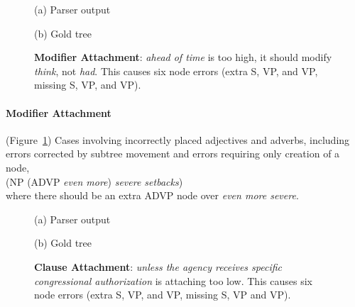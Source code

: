 \begin{figure}
\begin{center}

\vspace{3mm}
(a) Parser output

\vspace{6mm}


\vspace{3mm}
(b) Gold tree
\end{center}
\derivspace
\caption[Error analysis example: modifier attachment.]{ \label{fig:modifier-attachment} 
	\textbf{Modifier Attachment}: \emph{ahead of time} is too high, it should
	modify \emph{think}, not \emph{had}.  This causes six node errors (extra
	S, VP, and VP, missing S, VP, and VP).
}
\derivaftercompress
\end{figure}

\paragraph{Modifier Attachment} (Figure~\ref{fig:modifier-attachment})  Cases involving incorrectly placed adjectives
and adverbs, including errors corrected by subtree movement and errors
requiring only creation of a node, \myeg \\ (NP (ADVP \emph{even more})
\emph{severe setbacks}) \\ where there should be an extra ADVP node over
\emph{even more severe}.

\begin{figure}
\begin{center}

\vspace{3mm}
(a) Parser output

\vspace{6mm}


\vspace{3mm}
(b) Gold tree
\end{center}
\derivspace
\caption[Error analysis example: clause attachment.]{ \label{fig:clause-attachment} 
	\textbf{Clause Attachment}: \emph{unless the agency receives specific
	congressional authorization} is attaching too low. This causes six
	node errors (extra S, VP, and VP, missing S, VP and VP).
}
\derivaftercompress
\end{figure}

